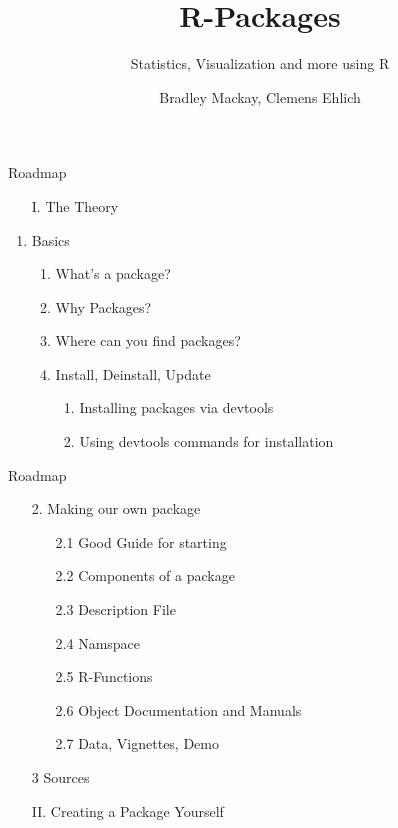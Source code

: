 \documentclass[11pt,a4paper]{beamer}
\author{Bradley Mackay, Clemens Ehlich}
\title[Short Title]{R-Packages}
\subtitle{Statistics, Visualization and more using R}
\institute{NAWI PLUS}
\date{}
\begin{document}
	

	\begin{frame}
	
		\titlepage
	\end{frame}


	\begin{frame}[t]{Roadmap}
	
	 	\begin{enumerate}
	 		\item[I.] The Theory
	 	\end{enumerate}
		\begin{enumerate}
			\item Basics
		
			\begin{enumerate}
				\item What's a package?
				\item Why Packages?
				\item Where can you find packages?
				\item Install, Deinstall, Update
					\begin{enumerate}
					\item Installing packages via devtools
					\item Using devtools commands for installation
				\end{enumerate}
			\end{enumerate}
		
		\end{enumerate}
		
	\end{frame}


\begin{frame}[t]{Roadmap}
	
	\begin{enumerate}
		\item [2.] Making our own package
		
		\begin{enumerate}
			\item [2.1] Good Guide for starting
			\item [2.2]Components of a package
			\item [2.3]Description File
			\item [2.4]Namspace
			\item [2.5]R-Functions
			\item [2.6]Object Documentation and Manuals
			\item [2.7]Data, Vignettes, Demo
		\end{enumerate}
		
		\item [3] Sources
		\item [II.]Creating a Package Yourself
		
	\end{enumerate}
	
\end{frame}
\end{document}
